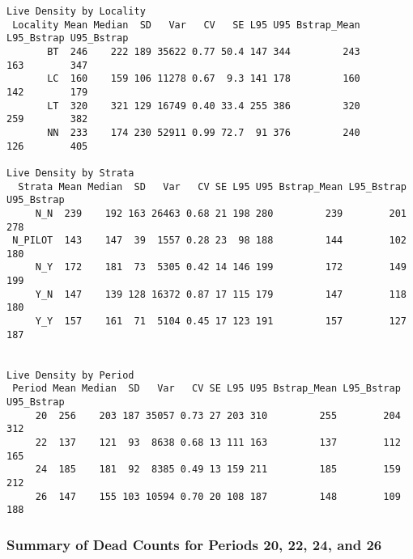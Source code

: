 \documentclass[
]{article}
\begin{document}
\begin{verbatim}
Live Density by Locality
 Locality Mean Median  SD   Var   CV   SE L95 U95 Bstrap_Mean L95_Bstrap U95_Bstrap
       BT  246    222 189 35622 0.77 50.4 147 344         243        163        347
       LC  160    159 106 11278 0.67  9.3 141 178         160        142        179
       LT  320    321 129 16749 0.40 33.4 255 386         320        259        382
       NN  233    174 230 52911 0.99 72.7  91 376         240        126        405

Live Density by Strata
  Strata Mean Median  SD   Var   CV SE L95 U95 Bstrap_Mean L95_Bstrap U95_Bstrap
     N_N  239    192 163 26463 0.68 21 198 280         239        201        278
 N_PILOT  143    147  39  1557 0.28 23  98 188         144        102        180
     N_Y  172    181  73  5305 0.42 14 146 199         172        149        199
     Y_N  147    139 128 16372 0.87 17 115 179         147        118        180
     Y_Y  157    161  71  5104 0.45 17 123 191         157        127        187


Live Density by Period
 Period Mean Median  SD   Var   CV SE L95 U95 Bstrap_Mean L95_Bstrap U95_Bstrap
     20  256    203 187 35057 0.73 27 203 310         255        204        312
     22  137    121  93  8638 0.68 13 111 163         137        112        165
     24  185    181  92  8385 0.49 13 159 211         185        159        212
     26  147    155 103 10594 0.70 20 108 187         148        109        188
\end{verbatim}

\newpage

\hypertarget{summary-of-dead-counts-for-periods-20-22-24-and-26}{%
\subsubsection{Summary of Dead Counts for Periods 20, 22, 24, and
26}\label{summary-of-dead-counts-for-periods-20-22-24-and-26}}
\end{document}
